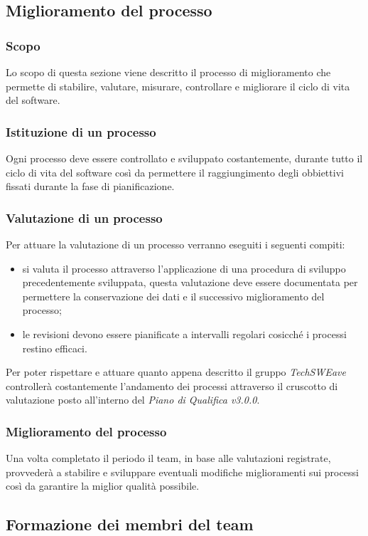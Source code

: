 \subsection{Miglioramento del processo}
\subsubsection{Scopo}
Lo scopo di questa sezione viene descritto il processo di miglioramento che permette di stabilire, valutare, misurare, controllare e migliorare il ciclo di vita del software.
\subsubsection{Istituzione di un processo}
Ogni processo deve essere controllato e sviluppato costantemente, durante tutto il ciclo di vita del software così da permettere il raggiungimento degli obbiettivi fissati durante la fase di pianificazione.
\subsubsection{Valutazione di un processo}
Per attuare la valutazione di un processo verranno eseguiti i seguenti compiti:
\begin{itemize}
    \item si valuta il processo attraverso l'applicazione di una procedura di sviluppo precedentemente sviluppata, questa valutazione deve essere documentata per permettere la conservazione dei dati e il successivo miglioramento del processo;
    \item le revisioni devono essere pianificate a intervalli regolari cosicché i processi restino efficaci.
\end{itemize}
Per poter rispettare e attuare quanto appena descritto il gruppo \textit{TechSWEave} controllerà costantemente l'andamento dei processi attraverso il cruscotto di valutazione posto all'interno del \textit{Piano di Qualifica v3.0.0}.
\subsubsection{Miglioramento del processo}
Una volta completato il periodo il team, in base alle valutazioni registrate, provvederà a stabilire e sviluppare eventuali modifiche miglioramenti sui processi così da garantire la miglior qualità possibile.



\subsection{Formazione dei membri del team}
